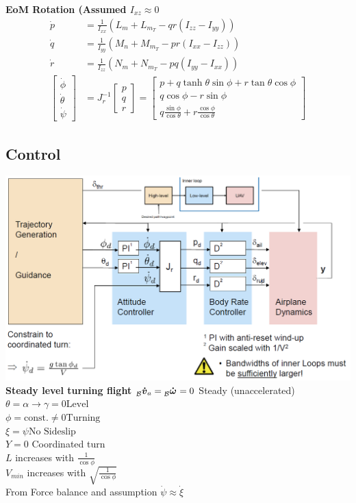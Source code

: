 \documentclass[a4paper, 8pt]{extarticle}
\newcommand{\mvec}[3]{  \prescript{}{\mathcal{#1}}{\bm{#2}}  _{#3} }
\begin{document}
\begin{multicols*}{3}
\textbf{EoM Rotation (Assumed $I_{xz} \approx 0$ }
\begin{align*}
    \dot{p} &= \frac{1}{I_{xx}}(L_{m}+L_{m_{T}}-qr(I_{zz}-I_{yy}))\\
    \dot{q} &= \frac{1}{I_{yy}}(M_{n}+M_{m_{T}}-pr(I_{xx}-I_{zz}))\\
    \dot{r} &= \frac{1}{I_{zz}}(N_{m}+N_{m_{T}}-pq(I_{yy}-I_{xx}))\\
    \begin{bmatrix} \dot{\phi} \\ \dot{\theta} \\ \dot{\psi}
    \end{bmatrix} &= J_{r}^{-1}\begin{bmatrix}
    p \\ q \\ r
    \end{bmatrix} = \begin{bmatrix}
    p+q\tanh{\theta}\sin{\phi}+r\tan{\theta}\cos{\phi}\\
    q\cos{\phi}-r\sin{\phi}\\
    q\frac{\sin{\phi}}{\cos{\theta}}+r\frac{\cos{\phi}}{\cos{\theta}}
    \end{bmatrix}
\end{align*}

\subsection{Control}
\includegraphics[width=1\linewidth]{images/FW_ControlLoop.png}\\
\textbf{Steady level turning flight}
$\mvec{\mathcal{B}}{\dot{v}}{a}=\mvec{\mathcal{B}}{\dot{\omega}}{}=0$ Steady (unaccelerated)\\
$\theta=\alpha \rightarrow \gamma =0 \textrm{Level}$\\
$\phi=\textrm{const.}\neq 0 \textrm{Turning}$\\
$\xi=\psi \textrm{No Sideslip}$\\
$Y=0$ Coordinated turn\\
$L$ increases with $\frac{1}{\cos{\phi}}$\\
$V_{min}$ increases with $\sqrt{\frac{1}{\cos{\phi}}}$\\
From Force balance and assumption $\dot{\psi} \approx \dot{\xi}$







\end{multicols*}
\end{document}
